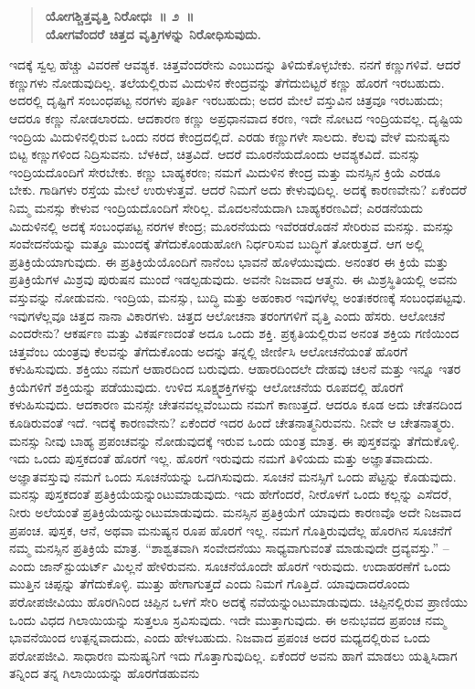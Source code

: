 \vspace{-0.3cm}

\begin{verse}
\textbf{ಯೋಗಶ್ಚಿತ್ತವೃತ್ತಿ ನಿರೋಧಃ~॥ ೨~॥\\ಯೋಗವೆಂದರೆ ಚಿತ್ತದ ವೃತ್ತಿಗಳನ್ನು ನಿರೋಧಿಸುವುದು. }
\end{verse}

ಇದಕ್ಕೆ ಸ್ವಲ್ಪ ಹೆಚ್ಚು ವಿವರಣೆ ಆವಶ್ಯಕ. ಚಿತ್ತವೆಂದರೇನು ಎಂಬುದನ್ನು ತಿಳಿದುಕೊಳ್ಳಬೇಕು. ನನಗೆ ಕಣ್ಣುಗಳಿವೆ. ಆದರೆ ಕಣ್ಣುಗಳು ನೋಡುವುದಿಲ್ಲ. ತಲೆಯಲ್ಲಿರುವ ಮಿದುಳಿನ ಕೇಂದ್ರವನ್ನು ತೆಗೆದುಬಿಟ್ಟರೆ ಕಣ್ಣು ಹೊರಗೆ ಇರಬಹುದು. ಅದರಲ್ಲಿ ದೃಷ್ಟಿಗೆ ಸಂಬಂಧಪಟ್ಟ ನರಗಳು ಪೂರ್ತಿ ಇರಬಹುದು; ಅದರ ಮೇಲೆ ವಸ್ತುವಿನ ಚಿತ್ರವೂ ಇರಬಹುದು; ಆದರೂ ಕಣ್ಣು ನೋಡಲಾರದು. ಆದಕಾರಣ ಕಣ್ಣು ಅಪ್ರಧಾನವಾದ ಕರಣ, ಇದೇ ನೋಟದ ಇಂದ್ರಿಯವಲ್ಲ. ದೃಷ್ಟಿಯ ಇಂದ್ರಿಯ ಮಿದುಳಿನಲ್ಲಿರುವ ಒಂದು ನರದ ಕೇಂದ್ರದಲ್ಲಿದೆ. ಎರಡು ಕಣ್ಣುಗಳೇ ಸಾಲದು. ಕೆಲವು ವೇಳೆ ಮನುಷ್ಯನು ಬಿಟ್ಟ ಕಣ್ಣುಗಳಿಂದ ನಿದ್ರಿಸುವನು. ಬೆಳಕಿದೆ, ಚಿತ್ರವಿದೆ. ಆದರೆ ಮೂರನೆಯದೊಂದು ಆವಶ್ಯಕವಿದೆ. ಮನಸ್ಸು ಇಂದ್ರಿಯದೊಂದಿಗೆ ಸೇರಬೇಕು. ಕಣ್ಣು ಬಾಹ್ಯಕರಣ; ನಮಗೆ ಮಿದುಳಿನ ಕೇಂದ್ರ ಮತ್ತು ಮನಸ್ಸಿನ ಕ್ರಿಯೆ ಎರಡೂ ಬೇಕು. ಗಾಡಿಗಳು ರಸ್ತೆಯ ಮೇಲೆ ಉರುಳುತ್ತವೆ. ಆದರೆ ನಿಮಗೆ ಅದು ಕೇಳುವುದಿಲ್ಲ. ಅದಕ್ಕೆ ಕಾರಣವೇನು? ಏಕೆಂದರೆ ನಿಮ್ಮ ಮನಸ್ಸು ಕೇಳುವ ಇಂದ್ರಿಯದೊಂದಿಗೆ ಸೇರಿಲ್ಲ. ಮೊದಲನೆಯದಾಗಿ ಬಾಹ್ಯಕರಣವಿದೆ; ಎರಡನೆಯದು ಮಿದುಳಿನಲ್ಲಿ ಅದಕ್ಕೆ ಸಂಬಂಧಪಟ್ಟ ನರಗಳ ಕೇಂದ್ರ; ಮೂರನೆಯದು ಇವೆರಡರೊಡನೆ ಸೇರಿರುವ ಮನಸ್ಸು. ಮನಸ್ಸು ಸಂವೇದನೆಯನ್ನು ಮತ್ತೂ ಮುಂದಕ್ಕೆ ತೆಗೆದುಕೊಂಡುಹೋಗಿ ನಿರ್ಧರಿಸುವ ಬುದ್ಧಿಗೆ ತೋರುತ್ತದೆ. ಆಗ ಅಲ್ಲಿ ಪ್ರತಿಕ್ರಿಯೆಯಾಗುವುದು. ಈ ಪ್ರತಿಕ್ರಿಯೆಯೊಂದಿಗೆ ನಾನೆಂಬ ಭಾವನೆ ಹೊಳೆಯುವುದು. ಅನಂತರ ಈ ಕ್ರಿಯೆ ಮತ್ತು ಪ್ರತಿಕ್ರಿಯೆಗಳ ಮಿಶ್ರವು ಪುರುಷನ ಮುಂದೆ ಇಡಲ್ಪಡುವುದು. ಅವನೇ ನಿಜವಾದ ಆತ್ಮನು. ಈ ಮಿಶ್ರಸ್ಥಿತಿಯಲ್ಲಿ ಅವನು ವಸ್ತುವನ್ನು ನೋಡುವನು. ಇಂದ್ರಿಯ, ಮನಸ್ಸು, ಬುದ್ಧಿ ಮತ್ತು ಅಹಂಕಾರ ಇವುಗಳೆಲ್ಲ ಅಂತಃಕರಣಕ್ಕೆ ಸಂಬಂಧಪಟ್ಟವು. ಇವುಗಳೆಲ್ಲವೂ ಚಿತ್ತದ ನಾನಾ ವಿಕಾರಗಳು. ಚಿತ್ತದ ಆಲೋಚನಾ ತರಂಗಗಳಿಗೆ ವೃತ್ತಿ ಎಂದು ಹೆಸರು. ಆಲೋಚನೆ ಎಂದರೇನು? ಆಕರ್ಷಣ ಮತ್ತು ವಿಕರ್ಷಣದಂತೆ ಅದೂ ಒಂದು ಶಕ್ತಿ. ಪ್ರಕೃತಿಯಲ್ಲಿರುವ ಅನಂತ ಶಕ್ತಿಯ ಗಣಿಯಿಂದ ಚಿತ್ತವೆಂಬ ಯಂತ್ರವು ಕೆಲವನ್ನು ತೆಗೆದುಕೊಂಡು ಅದನ್ನು ತನ್ನಲ್ಲಿ ಜೀರ್ಣಿಸಿ ಆಲೋಚನೆಯಂತೆ ಹೊರಗೆ ಕಳುಹಿಸುವುದು. ಶಕ್ತಿಯು ನಮಗೆ ಆಹಾರದಿಂದ ಬರುವುದು. ಆಹಾರದಿಂದಲೇ ದೇಹವು ಚಲನೆ ಮತ್ತು ಇನ್ನೂ ಇತರ ಕ್ರಿಯೆಗಳಿಗೆ ಶಕ್ತಿಯನ್ನು ಪಡೆಯುವುದು. ಉಳಿದ ಸೂಕ್ಷ್ಮಶಕ್ತಿಗಳನ್ನು ಆಲೋಚನೆಯ ರೂಪದಲ್ಲಿ ಹೊರಗೆ ಕಳುಹಿಸುವುದು. ಆದಕಾರಣ ಮನಸ್ಸೇ ಚೇತನವಲ್ಲವೆಂಬುದು ನಮಗೆ ಕಾಣುತ್ತದೆ. ಆದರೂ ಕೂಡ ಅದು ಚೇತನದಿಂದ ಕೂಡಿರುವಂತೆ ಇದೆ. ಇದಕ್ಕೆ ಕಾರಣವೇನು? ಏಕೆಂದರೆ ಇದರ ಹಿಂದೆ ಚೇತನಾತ್ಮನಿರುವನು. ನೀವೇ ಆ ಚೇತನಾತ್ಮರು. ಮನಸ್ಸು ನೀವು ಬಾಹ್ಯ ಪ್ರಪಂಚವನ್ನು ನೋಡುವುದಕ್ಕೆ ಇರುವ ಒಂದು ಯಂತ್ರ ಮಾತ್ರ. ಈ ಪುಸ್ತಕವನ್ನು ತೆಗೆದುಕೊಳ್ಳಿ. ಇದು ಒಂದು ಪುಸ್ತಕದಂತೆ ಹೊರಗೆ ಇಲ್ಲ. ಹೊರಗೆ ಇರುವುದು ನಮಗೆ ತಿಳಿಯದು ಮತ್ತು ಅಜ್ಞಾತವಾದುದು. ಅಜ್ಞಾತವಸ್ತುವು ನಮಗೆ ಒಂದು ಸೂಚನೆಯನ್ನು ಒದಗಿಸುವುದು. ಸೂಚನೆ ಮನಸ್ಸಿಗೆ ಒಂದು ಪೆಟ್ಟನ್ನು ಕೊಡುವುದು. ಮನಸ್ಸು ಪುಸ್ತಕದಂತೆ ಪ್ರತಿಕ್ರಿಯೆಯನ್ನುಂಟುಮಾಡುವುದು. ಇದು ಹೇಗೆಂದರೆ, ನೀರೊಳಗೆ ಒಂದು ಕಲ್ಲನ್ನು ಎಸೆದರೆ, ನೀರು ಅಲೆಯಂತೆ ಪ್ರತಿಕ್ರಿಯೆಯನ್ನುಂಟುಮಾಡುವುದು. ಮನಸ್ಸಿನ ಪ್ರತಿಕ್ರಿಯೆಗೆ ಯಾವುದು ಕಾರಣವೊ ಅದೇ ನಿಜವಾದ ಪ್ರಪಂಚ. ಪುಸ್ತಕ, ಆನೆ, ಅಥವಾ ಮನುಷ್ಯನ ರೂಪ ಹೊರಗೆ ಇಲ್ಲ. ನಮಗೆ ಗೊತ್ತಿರುವುದೆಲ್ಲ ಹೊರಗಿನ ಸೂಚನೆಗೆ ನಮ್ಮ ಮನಸ್ಸಿನ ಪ್ರತಿಕ್ರಿಯೆ ಮಾತ್ರ. “ಶಾಶ್ವತವಾಗಿ ಸಂವೇದನೆಯು ಸಾಧ್ಯವಾಗುವಂತೆ ಮಾಡುವುದೇ ದ್ರವ್ಯವಸ್ತು.” –ಎಂದು ಜಾನ್​ಸ್ಟುಯರ್ಟ್​ ಮಿಲ್ಲನೆ ಹೇಳಿರುವನು. ಸೂಚನೆಯೊಂದೇ ಹೊರಗೆ ಇರುವುದು. ಉದಾಹರಣೆಗೆ ಒಂದು ಮುತ್ತಿನ ಚಿಪ್ಪನ್ನು ತೆಗೆದುಕೊಳ್ಳಿ. ಮುತ್ತು ಹೇಗಾಗುತ್ತದೆ ಎಂದು ನಿಮಗೆ ಗೊತ್ತಿದೆ. ಯಾವುದಾದರೊಂದು ಪರೋಪಜೀವಿಯು ಹೊರಗಿನಿಂದ ಚಿಪ್ಪಿನ ಒಳಗೆ ಸೇರಿ ಅದಕ್ಕೆ ನವೆಯನ್ನುಂಟುಮಾಡುವುದು. ಚಿಪ್ಪಿನಲ್ಲಿರುವ ಪ್ರಾಣಿಯು ಒಂದು ವಿಧದ ಗಿಲಾಯಿಯನ್ನು ಸುತ್ತಲೂ ಸ್ರವಿಸುವುದು. ಇದೇ ಮುತ್ತಾಗುವುದು. ಈ ಅನುಭವದ ಪ್ರಪಂಚ ನಮ್ಮ ಭಾವನೆಯಿಂದ ಉತ್ಪನ್ನವಾದುದು, ಎಂದು ಹೇಳಬಹುದು. ನಿಜವಾದ ಪ್ರಪಂಚ ಅದರ ಮಧ್ಯದಲ್ಲಿರುವ ಒಂದು ಪರೋಪಜೀವಿ. ಸಾಧಾರಣ ಮನುಷ್ಯನಿಗೆ ಇದು ಗೊತ್ತಾಗುವುದಿಲ್ಲ. ಏಕೆಂದರೆ ಅವನು ಹಾಗೆ ಮಾಡಲು ಯತ್ನಿಸಿದಾಗ ತನ್ನಿಂದ ತನ್ನ ಗಿಲಾಯಿಯನ್ನು ಹೊರಗೆಡಹುವನು 